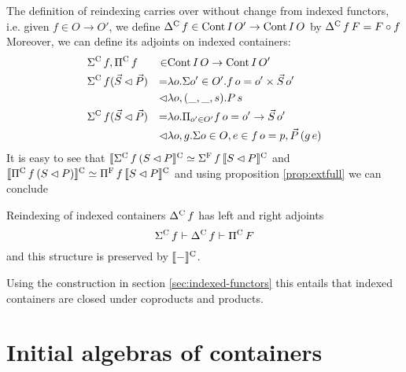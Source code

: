 \documentclass[10pt, conference, compsocconf]{IEEEtran}
\begin{document}
The definition of reindexing carries
over without change from indexed functors, i.e. given $f\in O\to O'$, we define 
$\Delta^\mathrm{C}\,f \in \mathrm{Cont}\,I\,O' \to \mathrm{Cont}\,I\,O$ by $\Delta^\mathrm{C}\,f\,F = F \circ f$
Moreover, we can define its adjoints on indexed containers:
\begin{align*}
  &\Sigma^\mathrm{C}\,f,\Pi^\mathrm{C}\,f & \in & \mathrm{Cont}\,I\,O \to \mathrm{Cont}\,I\,O'\\
  &\Sigma^\mathrm{C}\,f (\vec{S} \lhd \vec{P})
  & = &\lambda o.\Sigma o'\in O'.f\,o = o' \times \vec{S}\,o'\\
  && \lhd &\lambda o,(\_,\_,s).P\,s\\
  & \Sigma^\mathrm{C}\,f (\vec{S} \lhd \vec{P})
  & = & \lambda o.\Pi_{o'\in O'}f\,o = o' \to \vec{S}\,o' \\
  &&\lhd & \lambda o,g. \Sigma o\in O,e\in f\,o = p,\vec{P}\,(g\,e)
\end{align*}
It is easy to see that $\llbracket\Sigma^\mathrm{C}\,f\,(S \lhd P\rrbracket^{\mathrm C} \simeq
\Sigma^\mathrm{F}\,f\,\llbracket S \lhd P\rrbracket^{\mathrm C}$ and 
$\llbracket\Pi^\mathrm{C}\,f\,(S \lhd P)\rrbracket^{\mathrm C} \simeq
\Pi^\mathrm{F}\,f\,\llbracket S \lhd P\rrbracket^{\mathrm C}$ and using proposition \ref{prop:extfull} we can conclude
\begin{proposition}\label{prop:adjoints}
  Reindexing of indexed containers $\Delta^\mathrm{C}\,f$ has left and right adjoints
  \[ \Sigma^\mathrm{C}\,f \vdash \Delta^\mathrm{C}\,f \vdash \Pi^\mathrm{C}\,F \]
  and this structure is preserved by $\llbracket-\rrbracket^{\mathrm C}$.
\end{proposition}
Using the construction in section \ref{sec:indexed-functors} this entails that
indexed containers are closed under coproducts and products.

\section{Initial algebras of containers}
\label{sec:initial-algebras}

\end{document}

